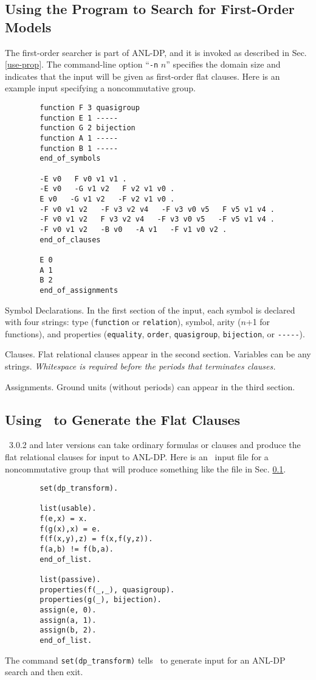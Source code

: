 \subsection{Using the Program to Search for First-Order Models} \label{use-fo}

The first-order searcher is part of ANL-DP, and it is invoked
as described in Sec. \ref{use-prop}.  The command-line option
``\verb:-n: $n$'' specifies the domain size and indicates that
the input will be given as first-order flat clauses.  Here is an
example input specifying a noncommutative group.
\begin{verbatim}
        function F 3 quasigroup
        function E 1 -----
        function G 2 bijection
        function A 1 -----
        function B 1 -----
        end_of_symbols

        -E v0   F v0 v1 v1 .
        -E v0   -G v1 v2   F v2 v1 v0 .
        E v0   -G v1 v2   -F v2 v1 v0 .
        -F v0 v1 v2   -F v3 v2 v4   -F v3 v0 v5   F v5 v1 v4 .
        -F v0 v1 v2   F v3 v2 v4   -F v3 v0 v5   -F v5 v1 v4 .
        -F v0 v1 v2   -B v0   -A v1   -F v1 v0 v2 .
        end_of_clauses

        E 0
        A 1
        B 2
        end_of_assignments
\end{verbatim}
\begin{description}
\item{Symbol Declarations.}
In the first section of the input, each symbol is declared with four
strings: type (\verb:function: or \verb:relation:), symbol, arity ($n$+1
for functions), and properties (\verb:equality:, \verb:order:,
\verb:quasigroup:, \verb:bijection:, or \verb:-----:).
\item{Clauses.}
Flat relational clauses appear in the second section.  Variables can
be any strings.  {\em Whitespace is required before the periods that
terminates clauses.}
\item{Assignments.}
Ground units (without periods) can appear in the third section.
\end{description}

\subsection{Using \otter\ to Generate the Flat Clauses}

\otter\ 3.0.2 \cite{otter3} and later versions can take ordinary formulas or
clauses and produce the flat relational clauses for input to ANL-DP.
Here is an \otter\ input file for a noncommutative group that will
produce something like the file in Sec. \ref{use-fo}.
\begin{verbatim}
        set(dp_transform).
        
        list(usable).
        f(e,x) = x.
        f(g(x),x) = e.
        f(f(x,y),z) = f(x,f(y,z)).
        f(a,b) != f(b,a).
        end_of_list.
        
        list(passive).
        properties(f(_,_), quasigroup).
        properties(g(_), bijection).
        assign(e, 0).
        assign(a, 1).
        assign(b, 2).
        end_of_list.
\end{verbatim}
The command \verb:set(dp_transform): tells \otter\ to generate
input for an ANL-DP search and then exit.   

